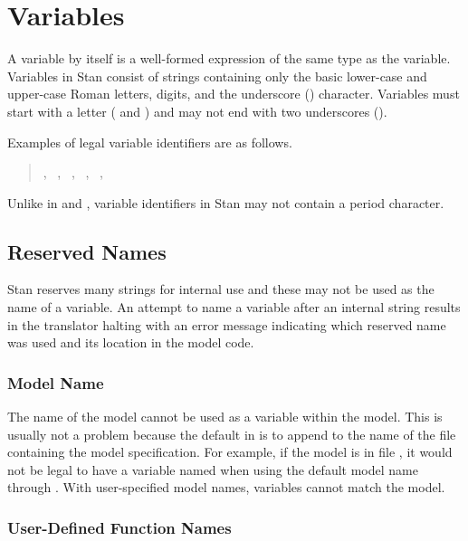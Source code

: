 \section{Variables}\label{variables.section}

A variable by itself is a well-formed expression of the same type as
the variable.  Variables in Stan consist of \ASCII strings containing
only the basic lower-case and upper-case Roman letters, digits, and
the underscore (\code{\_}) character.  Variables must start with a
letter ( and ) and may not end with two underscores
(\code{\_\_}).

Examples of legal variable identifiers are as follows.
%
\begin{quote}
,
\ ,
\ ,
\ ,
\ ,
\ 
\end{quote}
%
Unlike in \R and \BUGS, variable identifiers in Stan may not contain
a period character.

\subsection{Reserved Names}

Stan reserves many strings for internal use and these may not be used
as the name of a variable.  An attempt to name a variable after an
internal string results in the  translator halting with an
error message indicating which reserved name was used and its location
in the model code.

\subsubsection{Model Name}

The name of the model cannot be used as a variable within the model.
This is usually not a problem because the default in 
is to append  to the name of the file containing the
model specification.  For example, if the model is in file
, it would not be legal to have a variable named
 when using the default model name through
.  With user-specified model names, variables cannot
match the model.

\subsubsection{User-Defined Function Names}

